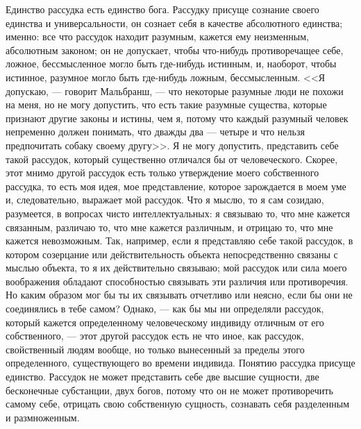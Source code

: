 \documentclass[12pt,oneside]{book}
\begin{document}
Единство рассудка есть единство бога. Рассудку присуще сознание своего единства и универсальности, он сознает себя в качестве абсолютного единства; именно: все что рассудок находит разумным, кажется ему неизменным, абсолютным законом; он не допускает, чтобы что-нибудь противоречащее себе, ложное, бессмысленное могло быть где-нибудь истинным, и, наоборот, чтобы истинное, разумное могло быть где-нибудь ложным, бессмысленным. <<Я допускаю, --- говорит Мальбранш, --- что некоторые разумные люди не похожи на меня, но не могу допустить, что есть такие разумные существа, которые признают другие законы и истины, чем я, потому что каждый разумный человек непременно должен понимать, что дважды два --- четыре и что нельзя предпочитать собаку своему другу>>\dag\let\svthefootnote\thefootnote\let\thefootnote\relax{}\let\thefootnote\svthefootnote. Я не могу допустить, представить себе такой рассудок, который существенно отличался бы от человеческого. Скорее, этот мнимо другой рассудок есть только утверждение моего собственного рассудка, то есть моя идея, мое представление, которое зарождается в моем уме и, следовательно, выражает мой рассудок. Что я мыслю, то я сам созидаю, разумеется, в вопросах чисто интеллектуальных: я связываю то, что мне кажется связанным, различаю то, что мне кажется различным, и отрицаю то, что мне кажется невозможным. Так, например, если я представляю себе такой рассудок, в котором созерцание или действительность объекта непосредственно связаны с мыслью объекта, то я их действительно связываю; мой рассудок или сила моего воображения обладают способностью связывать эти различия или противоречия. Но каким образом мог бы ты их связывать отчетливо или неясно, если бы они не соединялись в тебе самом? Однако, --- как бы мы ни определяли рассудок, который кажется определенному человеческому индивиду отличным от его собственного, --- этот другой рассудок есть не что иное, как рассудок, свойственный людям вообще, но только вынесенный за пределы этого определенного, существующего во времени индивида. Понятию рассудка присуще единство. Рассудок не может представить себе две высшие сущности, две бесконечные субстанции, двух богов, потому что он не может противоречить самому себе, отрицать свою собственную сущность, сознавать себя разделенным и размноженным.
\end{document}

